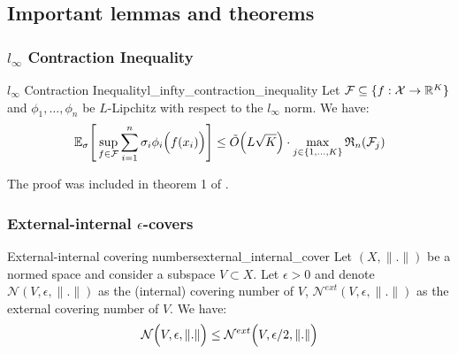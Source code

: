 \subsection{Important lemmas and theorems}
\subsubsection{$l_\infty$ Contraction Inequality}
\begin{theorem}{$l_\infty$ Contraction Inequality}{l_infty_contraction_inequality}
    Let $\mathcal{F}\subseteq\{f:\mathcal{X} \to \mathbb{R}^K\}$ and $\phi_1, \dots, \phi_n$ be $L$-Lipchitz with respect to the $l_\infty$ norm. We have:
    \begin{align*}
        \mathbb{E}_\sigma\Bigg[ 
            \sup_{f\in\mathcal{F}}\sum_{i=1}^n \sigma_i\phi_i\Big( f(x_i) \Big) 
         \Bigg]\le \tilde O\Big( L\sqrt K \Big)\cdot\max_{j\in\{1, \dots, K\}} \mathfrak{R}_n(\mathcal{F}_j)
    \end{align*}
\end{theorem}

\begin{proof*}
    The proof was included in theorem 1 of \cite{article:foster}.
\end{proof*}


\subsubsection{External-internal $\epsilon$-covers}
\begin{lemma}{External-internal covering numbers}{external_internal_cover}
    Let $(X, \|.\|)$ be a normed space and consider a subspace $V\subset X$. Let $\epsilon > 0$ and denote $\mathcal{N}(V, \epsilon, \|.\|)$ as the (internal) covering number of $V$, $\mathcal{N}^{ext}(V, \epsilon, \|.\|)$ as the external covering number of $V$. We have:
    \begin{align*}
        \mathcal{N}\Big( V, \epsilon, \|.\| \Big) \le \mathcal{N}^{ext}\Big( V, \epsilon/2, \|.\| \Big)
    \end{align*} 
\end{lemma}


